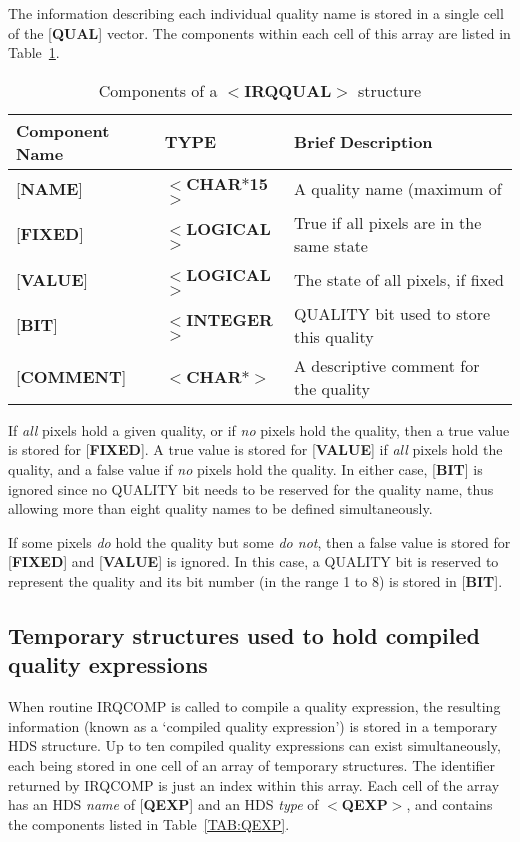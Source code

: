 \documentclass[twoside,11pt]{article}
\newcommand{\latex}[1]{#1}
\newcommand{\html}[1]{}
\newcommand{\latexhtml}[2]{#1}
\renewcommand{\_}{\texttt{\symbol{95}}}
\begin{document}
The information describing each individual quality name is stored in a single
cell of the {[}{\bf QUAL}{]} vector. The components within each cell of this 
array are listed in 
\latexhtml{Table~\ref {TAB:QUAL}}{Table~2}.

\begin{table}[htb]
\centering
\latex{\caption{Components of a $<${\bf IRQ\_QUAL}$>$ structure}}
\html{\caption{{\bf 2:} Components of a $<${\bf IRQ\_QUAL}$>$ structure}}
\label{TAB:QUAL}
\begin{tabular}{|l|l|l|}
\hline
Component Name & TYPE & Brief Description \\ \hline
{[}{\bf NAME}{]} & $<${\bf \_CHAR$\ast$15}$>$ & A quality name (maximum of
\\
{[}{\bf FIXED}{]} & $<${\bf \_LOGICAL}$>$ & True if all pixels are in the same 
state\\
{[}{\bf VALUE}{]} & $<${\bf \_LOGICAL}$>$ & The state of all pixels, if fixed\\
{[}{\bf BIT}{]} & $<${\bf \_INTEGER}$>$ & QUALITY bit used to store this 
quality\\
{[}{\bf COMMENT}{]} & $<${\bf \_CHAR$\ast$}$>$ & A descriptive comment for the 
quality\\
\hline
\end{tabular}
\end{table}

If {\em all} pixels hold a given quality, or if {\em no} pixels hold the
quality, then a true value is stored for {[}{\bf FIXED}{]}. A true value is
stored for {[}{\bf VALUE}{]} if {\em all} pixels hold the quality, and a false
value if {\em no} pixels hold the quality. In either case, {[}{\bf BIT}{]} is
ignored since no QUALITY bit needs to be reserved for the quality name, thus
allowing more than eight quality names to be defined simultaneously. 

If some pixels {\em do} hold the quality but some {\em do not}, then a false 
value is stored for {[}{\bf FIXED}{]} and {[}{\bf VALUE}{]} is ignored. In this 
case, a QUALITY bit is reserved to represent the quality and its bit number (in 
the range 1 to 8) is stored in {[}{\bf BIT}{]}.

\subsection{Temporary structures used to hold compiled quality expressions}
When routine IRQ\_COMP is called to compile a quality expression, the resulting
information (known as a `compiled quality expression') is stored in a
temporary HDS structure. Up to ten compiled quality expressions can exist
simultaneously, each being stored in one cell of an array of temporary
structures. The identifier returned by IRQ\_COMP is just an index within this
array. Each cell of the array has an HDS {\em name} of {[}{\bf QEXP}{]} and an
HDS {\em type} of $<${\bf QEXP}$>$, and contains the components listed in 
\latexhtml{Table~\ref {TAB:QEXP}}{Table 3}. 
\end{document}
